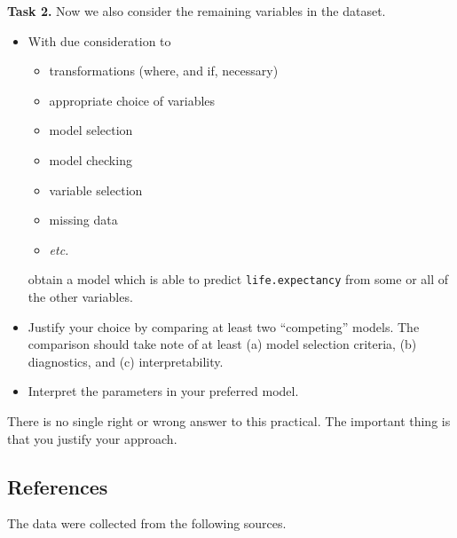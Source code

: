 \documentclass[
  a4paper,
]{article}
\providecommand{\tightlist}{%
  \setlength{\itemsep}{0pt}\setlength{\parskip}{0pt}}
\theoremstyle{definition}
\theoremstyle{definition}
\theoremstyle{definition}
\theoremstyle{definition}
\theoremstyle{remark}
\begin{document}
\textbf{Task 2.} Now we also consider the remaining variables in the dataset.

\begin{itemize}
\item
  With due consideration to

  \begin{itemize}
  \tightlist
  \item
    transformations (where, and if, necessary)
  \item
    appropriate choice of variables
  \item
    model selection
  \item
    model checking
  \item
    variable selection
  \item
    missing data
  \item
    \emph{etc.}
  \end{itemize}

  obtain a model which is able to predict \texttt{life.expectancy} from some or all
  of the other variables.
\item
  Justify your choice by comparing at least two ``competing'' models.
  The comparison should take note of at
  least (a) model selection criteria, (b) diagnostics, and (c) interpretability.
\item
  Interpret the parameters in your preferred model.
\end{itemize}

There is no single right or wrong answer to this practical.
The important thing is that you justify your approach.

\hypertarget{references}{%
\subsection*{References}\label{references}}

The data were collected from the following sources.
\end{document}

